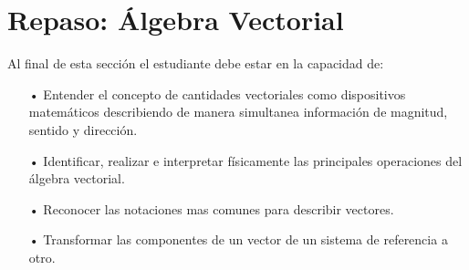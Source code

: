 \chapter{Repaso: Álgebra Vectorial}

Al final de esta sección el estudiante debe estar en la capacidad de:
\begin{itemize}
\item[•] Entender el concepto de cantidades vectoriales como dispositivos matemáticos describiendo de manera simultanea información de magnitud, sentido y dirección.
\item[•] Identificar, realizar e interpretar físicamente las principales operaciones del álgebra vectorial.
\item[•] Reconocer las notaciones mas comunes para describir vectores.
\item[•] Transformar las componentes de un vector de un sistema de referencia a otro.
\end{itemize}
